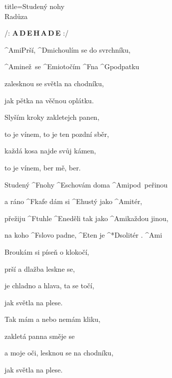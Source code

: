 \begin{song}{title=\predtitle\centering Studený nohy \\\large Radůza\vspace*{-0.3cm}}  %
\begin{centerjustified}
\nejvetsi

\predehra 
/: \textbf{A\,D\,E\,H\,A\,D\,E} :/

\sloka 
	^{Ami}Prší, ^{Dmi\z}choulím se do svrchníku,

	^{Ami\z}než~se ^{Emi\z}otočím ^{F}na ^{G}podpatku
	
	zalesknou se světla na chodníku,
   	
   	jak pětka na věčnou oplátku.

\sloka
	Slyším kroky zakletejch panen,
   	
   	to je vínem, to je ten pozdní sběr,
   
   	každá kosa najde svůj kámen,
   	
   	to je vínem, ber mě, ber.

	Studený ^{F\z}nohy ^{E\z}schovám doma ^{Ami\z}pod~peřinou

	a ráno ^{F\z}kafe dám si ^{E\z}hustý jako ^{Ami\z}tér,\:\:\:\:

	přežiju ^{F\z}tuhle ^{\z E}neděli tak jako ^{Ami\z}každou jinou,

	na koho ^{F\z}slovo padne, ^{E}ten je ^*{\z D}solitér . ^{Ami} 

\sloka
	Broukám si píseň o klokočí,
   	
   	prší a dlažba leskne se,
   	
   	je chladno a hlava, ta se točí,
   	
   	jak světla na plese.


\sloka
	Tak mám a nebo nemám kliku,
   
   	zakletá panna směje se
   	
   	a moje oči, lesknou se na chodníku,
   	
   	jak světla na plese.


\end{centerjustified}
\setcounter{Slokočet}{0}
\end{song}
